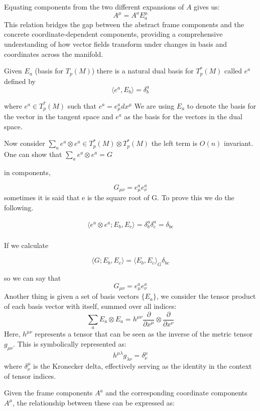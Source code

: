 \documentclass{article}
\begin{document}
Equating components from the two different expansions of $A$ gives us:
\[
A^\mu = A^a E_a^\mu
\]
This relation bridges the gap between the abstract frame components and the concrete coordinate-dependent components, providing a comprehensive understanding of how vector fields transform under changes in basis and coordinates across the manifold.

Given \( E_a \) (basis for \( T_p(M) \)) there is a natural dual basis for \( T_p^{*}(M)\) called \( e^a\) defined by 
\[ \langle e^a, E_b \rangle = \delta_b^{a} \]

where \( e^a \in T_p^{*}(M) \) such that \( e^a = e^a_{\mu} dx^\mu \)
We are using \(E_a\) to denote the basis for the vector in the tangent space and \(e^a\) as the basis for the vectors in the dual space. 

Now consider \( \sum_{a}^{} e^a \otimes e^a \in T_p^{*}(M) \otimes T_p^{*}(M)  \)
the left term is \( O(n) \) invariant. One can show that \( \sum_{a}^{} e^a \otimes e^a 
= G \)

in components, 

\[ G_{\mu \nu} = e^a_{\mu} e^a_{\nu} \]
sometimes it is said that e is the square root of G. To prove this we do the following. 

\begin{align*}
    \langle e^a \otimes e^a; E_b,E_c \rangle = \delta^a_{b} \delta_c^{a} = \delta_{bc} \\
\end{align*}

If we calculate 

\[ \langle G; E_b, E_c \rangle = \langle E_b, E_c \rangle_G \delta_{bc} \]

so we can say that \[ G_{\mu \nu} = e^a_{\mu} e^a_{\nu} \]
Another thing is given a set of basis vectors $\{E_a\}$, we consider the tensor product of each basis vector with itself, summed over all indices:
\[
\sum_a E_a \otimes E_a = h^{\mu \nu} \frac{\partial}{\partial x^\mu} \otimes \frac{\partial}{\partial x^\nu}
\]
Here, $h^{\mu \nu}$ represents a tensor that can be seen as the inverse of the metric tensor $g_{\mu \nu}$. This is symbolically represented as:
\[
h^{\mu \lambda} g_{\lambda \nu} = \delta^\mu_\nu
\]
where $\delta^\mu_\nu$ is the Kronecker delta, effectively serving as the identity in the context of tensor indices.

Given the frame components \(A^a\) and the corresponding coordinate components \(A^\mu\), the relationship between these can be expressed as:
\end{document}
